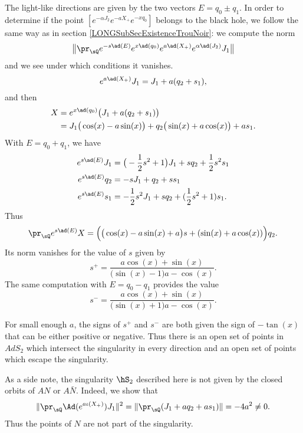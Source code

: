 The light-like directions are given by the two vectors $E=q_0\pm q_1$. In order to determine if the point $[e^{-\alpha J_2}e^{-aX_+} e^{-xq_0}]$ belongs to the black hole, we follow the same way as in section \ref{LONGSubSecExistenceTrouNoir}: we compute the norm
\begin{equation}
    \big\| \pr_{\sQ}  e^{-s\ad(E)}e^{x\ad(q_0)} e^{a\ad(X_+)} e^{\alpha\ad(J_2)}J_1 \big\|
\end{equation}
and we see under which conditions it vanishes. 
%
\begin{equation}
    e^{a\ad(X_+)}J_1=J_1+a(q_2+s_1),
\end{equation}
and then
\begin{equation}
    \begin{aligned}[]
        X&= e^{x\ad(q_0)}\big( J_1+a(q_2+s_1) \big)\\
        &=J_1\big( \cos(x)-a\sin(x) \big)+q_2\big( \sin(x)+a\cos(x) \big)+as_1.
    \end{aligned}
\end{equation}
With $E=q_0+q_1$, we have
\begin{equation}
    \begin{aligned}[]
        e^{s\ad(E)}J_1&=\big( -\frac{ 1 }{2}s^2+1 \big)J_1+sq_2+\frac{ 1 }{2}s^2s_1\\
        e^{s\ad(E)}q_2&=-sJ_1+q_2+ss_1\\
        e^{s\ad(E)}s_1&=-\frac{ 1 }{2}s^2J_1+sq_2+(\frac{ 1 }{2}s^2+1)s_1.
    \end{aligned}
\end{equation}
Thus
\begin{equation}
    \pr_{\sQ} e^{s\ad(E)}X=\Big( \big( \cos(x)-a\sin(x)+a \big)s+(\sin(x)+a\cos(x)) \Big)q_2.
\end{equation}
Its norm vanishes for the value of $s$ given by
\begin{equation}
    s^+=\frac{ a\cos(x)+\sin(x) }{ \big( \sin(x)-1 \big)a-\cos(x) }.
\end{equation}
The same computation with $E=q_0-q_1$ provides the value
\begin{equation}
    s^-=\frac{ a\cos(x)+\sin(x) }{ \big( \sin(x)+1 \big)a-\cos(x) }.
\end{equation}

For small enough $a$, the signs of $s^+$ and $s^-$ are both given the sign of $-\tan(x)$ that can be either positive or negative. Thus there is an open set of points in $AdS_2$ which intersect the singularity in every direction and an open set of points which escape the singularity.

As a side note, the singularity $\hS_2$ described here is not given by the closed orbits of $AN$ or $A\bar N$. Indeed, we show that
\begin{equation}
    \| \pr_{\sQ}\Ad( e^{a\iota(X_+)})J_1 \|^2=\| \pr_{\sQ}(J_1+aq_2+as_1) \|=-4a^2\neq 0.
\end{equation}
Thus the points of $N$ are not part of the singularity.
